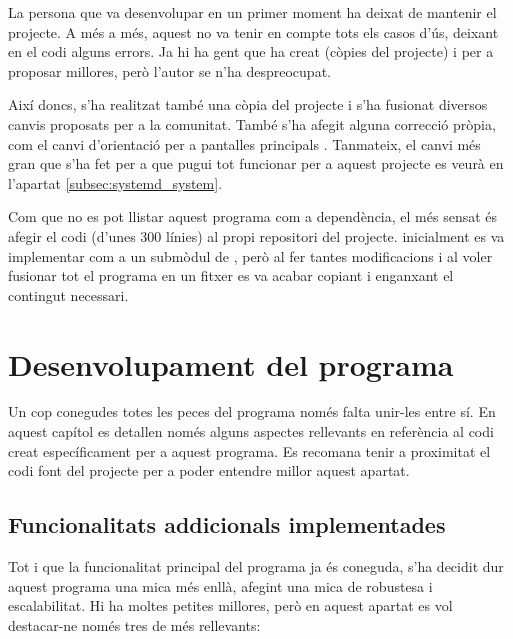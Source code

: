 La persona que va desenvolupar  en un primer moment ha deixat de
mantenir el projecte. A més a més, aquest no va tenir en compte tots els casos
d'ús, deixant en el codi alguns errors. Ja hi ha gent que ha creat 
(còpies del projecte) i  per a proposar millores, però
l'autor se n'ha despreocupat.

Així doncs, s'ha realitzat també una còpia del projecte i s'ha fusionat diversos
canvis proposats per a la comunitat. També s'ha afegit alguna correcció pròpia,
com el canvi d'orientació per a pantalles principals \cite{PyrandrOwn}. Tanmateix, el canvi més
gran que s'ha fet per a que pugui tot funcionar per a aquest projecte es veurà
en l'apartat \ref{subsec:systemd_system}.

Com que no es pot llistar aquest programa com a dependència, el més sensat és
afegir el codi (d'unes 300 línies) al propi repositori del projecte. inicialment
es va implementar com a un submòdul de , però al fer tantes
modificacions i al voler fusionar tot el programa en un fitxer es va acabar
copiant i enganxant el contingut necessari.

\section{Desenvolupament del programa}

Un cop conegudes totes les peces del programa només falta unir-les entre sí. En
aquest capítol es detallen només alguns aspectes rellevants en referència al codi
creat específicament per a aquest programa. Es recomana tenir a proximitat el
codi font del projecte per a poder entendre millor aquest apartat.

\subsection{Funcionalitats addicionals implementades}

Tot i que la funcionalitat principal del programa ja és coneguda, s'ha decidit
dur aquest programa una mica més enllà, afegint una mica de robustesa i
escalabilitat. Hi ha moltes petites millores, però en aquest apartat es vol
destacar-ne només tres de més rellevants:

